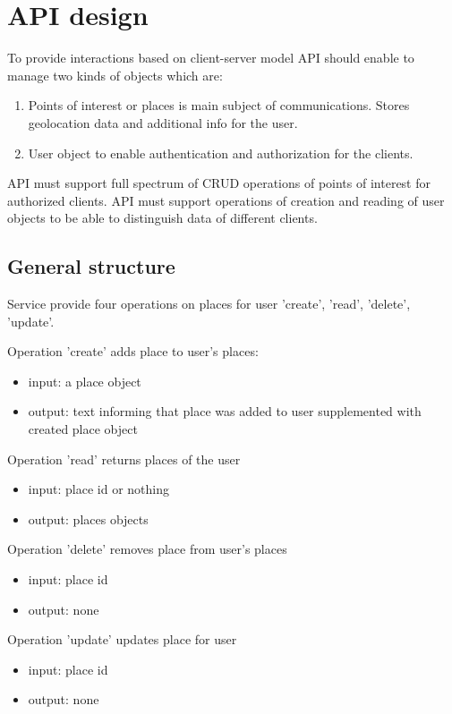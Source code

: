 \documentclass[thesis=M,english]{FITthesis}[2012/10/20]
\begin{document}
\section{API design}

To provide interactions based on client-server model API should enable to manage two kinds of objects which are:

\begin{enumerate}

	\item Points of interest or places is main subject of communications. Stores geolocation data and additional info for the user.
	\item	User object to enable authentication and authorization for the clients.

\end{enumerate}

API must support full spectrum of CRUD operations of points of interest for authorized clients.
API must support operations of creation and reading of user objects to be able to distinguish data of different clients.

\subsection{General structure}
Service provide four operations on places for user 'create', 'read', 'delete', 'update'.

Operation 'create' adds place to user’s places:
	\begin{itemize}
		\item input: a place object
		\item output: text informing that place was added to user supplemented with created place object
	\end{itemize}

Operation 'read' returns places of the user
	\begin{itemize}
		\item input: place id or nothing
		\item output: places objects
	\end{itemize}

Operation 'delete' removes place from user’s places
	\begin{itemize}
		\item input: place id
		\item output: none
	\end{itemize}

Operation 'update' updates place for user
	\begin{itemize}
		\item input: place id
		\item output: none
	\end{itemize}
\end{document}
